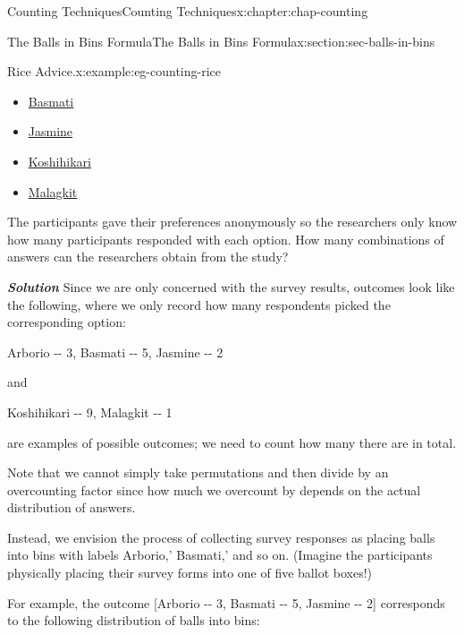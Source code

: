 \documentclass[oneside,10pt,]{book}
\newcommand{\tabularfont}{\relax}
\newcommand{\alert}[1]{\textbf{\textit{#1}}}
\numberwithin{equation}{section}
\begin{document}
\begin{chapterptx}{Counting Techniques}{}{Counting Techniques}{}{}{x:chapter:chap-counting}
\begin{sectionptx}{The Balls in Bins Formula}{}{The Balls in Bins Formula}{}{}{x:section:sec-balls-in-bins}
\begin{example}{Rice Advice.}{x:example:eg-counting-rice}
\begin{itemize}[label=\textbullet]
\item{}\href{https://en.wikipedia.org/wiki/Basmati}{Basmati}%
\item{}\href{https://en.wikipedia.org/wiki/Jasmine_rice}{Jasmine}%
\item{}\href{https://en.wikipedia.org/wiki/Koshihikari}{Koshihikari}%
\item{}\href{https://en.wikipedia.org/wiki/Glutinous_rice}{Malagkit}%
\end{itemize}
The participants gave their preferences anonymously so the researchers only know how many participants responded with each option. How many combinations of answers can the researchers obtain from the study?%
\par
\alert{Solution} Since we are only concerned with the survey results, outcomes look like the following, where we only record how many respondents picked the corresponding option:%
\begin{sidebyside}{1}{0.125}{0.125}{0}%
\begin{sbspanel}{0.75}%
Arborio -{}-{} 3, Basmati -{}-{} 5, Jasmine -{}-{} 2%
\end{sbspanel}%
\end{sidebyside}%
\par
and%
\begin{sidebyside}{1}{0.125}{0.125}{0}%
\begin{sbspanel}{0.75}%
Koshihikari -{}-{} 9, Malagkit -{}-{} 1%
\end{sbspanel}%
\end{sidebyside}%
\par
are examples of possible outcomes; we need to count how many there are in total.%
\par
Note that we cannot simply take permutations and then divide by an overcounting factor since how much we overcount by depends on the actual distribution of answers.%
\par
Instead, we envision the process of collecting survey responses as placing balls into bins with labels \textasciigrave{}Arborio,' \textasciigrave{}Basmati,' and so on. (Imagine the participants physically placing their survey forms into one of five ballot boxes!)%
\par
For example, the outcome [Arborio -{}-{} 3, Basmati -{}-{} 5, Jasmine -{}-{} 2] corresponds to the following distribution of balls into bins:%
\begin{sidebyside}{1}{0.05}{0.05}{0}%
\begin{sbspanel}{0.9}%
{\centering%
{\tabularfont%
\begin{tabular}{ccccc}

\end{tabular}}}
\end{sbspanel}
\end{sidebyside}
\end{example}
\end{sectionptx}
\end{chapterptx}
\end{document}
